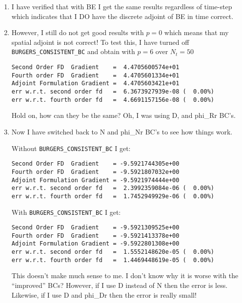 \documentclass[12pt]{article}
\begin{document}
\begin{enumerate}
\item I have verified that with BE I get the same results regardless of
  time-step which indicates that I DO have the discrete adjoint of BE in time
  correct.

\item However, I still do not get good results with $p=0$ which means that my
  spatial adjoint is not correct!  To test this, I have turned off {\tt
    BURGERS\_CONSISTENT\_BC} and obtain with $p=6$ over $N_t=50$
\begin{verbatim}
Second Order FD  Gradient    =  4.4705600574e+01
Fourth order FD  Gradient    =  4.4705601334e+01
Adjoint Formulation Gradient =  4.4705603421e+01
err w.r.t. second order fd   =  6.3673927939e-08 (  0.00%)
err w.r.t. fourth order fd   =  4.6691157156e-08 (  0.00%)
\end{verbatim}
Hold on, how can they be the same? Oh, I was using D, and phi\_Rr BC's.

\item Now I have switched back to N and phi\_Nr BC's to see how things work.

Without {\tt BURGERS\_CONSISTENT\_BC} I get:
\begin{verbatim}
Second Order FD  Gradient    = -9.5921744305e+00
Fourth order FD  Gradient    = -9.5921807032e+00
Adjoint Formulation Gradient = -9.5921974444e+00
err w.r.t. second order fd   =  2.3992359084e-06 (  0.00%)
err w.r.t. fourth order fd   =  1.7452949929e-06 (  0.00%)
\end{verbatim}

With {\tt BURGERS\_CONSISTENT\_BC} I get:
\begin{verbatim}
Second Order FD  Gradient    = -9.5921309525e+00
Fourth order FD  Gradient    = -9.5921413378e+00
Adjoint Formulation Gradient = -9.5922801308e+00
err w.r.t. second order fd   =  1.5552148620e-05 (  0.00%)
err w.r.t. fourth order fd   =  1.4469448619e-05 (  0.00%)
\end{verbatim}
This doesn't make much sense to me.  I don't know why it is worse with the
``improved'' BCs?  However, if I use D instead of N then the error is
less. Likewise, if I use D and phi\_Dr then the error is really small!


\end{enumerate}
\end{document}
